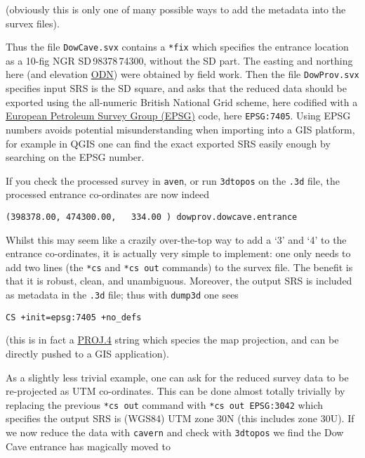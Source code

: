 \documentclass[]{article}
\begin{document}
(obviously this is only one of many possible ways to add the metadata
into the survex files).

Thus the file \verb}DowCave.svx} contains a \verb}*fix} which
specifies the entrance location as a 10-fig NGR
SD\,98378\,74300, without the SD part. The easting and
northing here (and elevation
\href{https://en.wikipedia.org/wiki/Ordnance_datum}{ODN}) were obtained
by field work. Then the file \verb}DowProv.svx} specifies input SRS is
the SD square, and asks that the reduced data should be exported
using the all-numeric British National Grid scheme, here codified with a
\href{http://spatialreference.org/}{European Petroleum Survey Group
  (EPSG)} code, here \verb+EPSG:7405+.
Using EPSG numbers avoids potential misunderstanding when
importing into a GIS platform, for example in QGIS one can find the
exact exported SRS easily enough by searching on the EPSG number.

If you check the processed survey in \verb}aven}, or run
\verb}3dtopos} on the \verb}.3d} file, the processed entrance
co-ordinates are now indeed

\begin{verbatim}
(398378.00, 474300.00,   334.00 ) dowprov.dowcave.entrance
\end{verbatim}

Whilst this may seem like a crazily over-the-top way to add a `3' and
`4' to the entrance co-ordinates, it is actually very simple to
implement: one only needs to add two lines (the \verb}*cs} and
\verb}*cs out} commands) to the survex file. The benefit is that it
is robust, clean, and unambiguous. Moreover, the output SRS is included
as metadata in the \verb}.3d} file; thus with \verb}dump3d} one sees

\begin{verbatim}
CS +init=epsg:7405 +no_defs
\end{verbatim}

(this is in fact a \href{http://proj4.org/}{PROJ.4} string which species
the map projection, and can be directly pushed to a GIS application).

As a slightly less trivial example, one can ask for the reduced survey
data to be re-projected as UTM co-ordinates. This can be done almost
totally trivially by replacing the previous \verb}*cs out} command
with \verb}*cs out EPSG:3042} which specifies the output SRS is
(WGS84) UTM zone 30N (this includes zone 30U). If we now reduce the data
with \verb}cavern} and check with \verb}3dtopos} we find the Dow
Cave entrance has magically moved to
\end{document}
